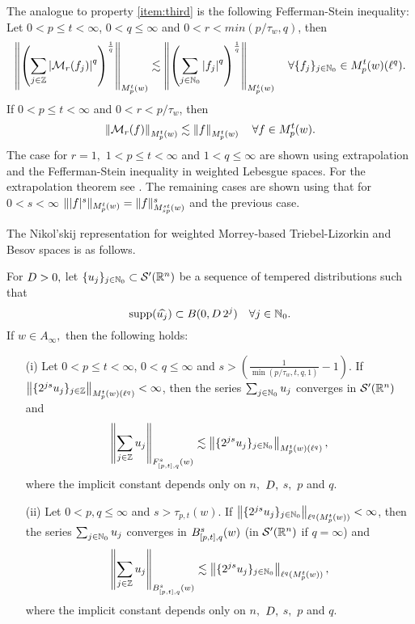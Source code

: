 {The analogue to property \ref{item:third} is the following Fefferman-Stein inequality:
Let $0<p\leq t<\infty$, $0<q\leq\infty$ and $0<r<min(p/\tau_w,q)$, then
\begin{equation}\label{eq:FTMorrey}
\norm{\left(\sum_{j\in\ent} \abs{\M_r(f_j)}^q\right)^{\frac{1}{q}}}{\mow{p}{t}{w}}\lesssim \norm{\left(\sum_{j\in\na_0} \abs{f_j}^q\right)^{\frac{1}{q}}}{\mow{p}{t}{w}}\quad \forall \{f_j\}_{j\in \na_0}\in \mow{p}{t}{w}(\ell^q).
\end{equation}
If $0<p\leq t <\infty$ and $0<r<p/\tau_w$, then 
\begin{equation*}
\norm{\M_r(f)}{\mow{p}{t}{w}}\lesssim \norm{f}{\mow{p}{t}{w}}\quad \forall f\in \mow{p}{t}{w}. 
\end{equation*}
The case for $r=1,$ $1<p\le t<\infty$ and $1<q\le \infty$ are shown using extrapolation and the Fefferman-Stein inequality in weighted Lebesgue spaces. For the extrapolation theorem see \cite[Theorem 5.3]{MR3538648}. The remaining cases are shown using that for $0<s<\infty$ $\| |f|^s \|_{\mow{p}{t}{w}} = \|f\|^s_{\mow{sp}{st}{w}}$ and the previous case.

The Nikol'skij representation for weighted Morrey-based Triebel-Lizorkin and Besov spaces is as follows.
\begin{theorem}\label{thm:Nikolskij:Morrey:weighted} For $\A> 0,$ let $\{u_j\}_{j \in \naz} \subset \mathcal{S}'(\rn)$ be a sequence of tempered distributions such that
\begin{equation*}
\supp(\widehat{u_j}) \subset B(0, \A\, 2^j ) \quad \forall j \in \naz.
\end{equation*}
If $w\in A_\infty,$ then the following holds:  
\begin{enumerate}
\item[(i)]\label{item:thh:Nikolskij:Morrey:TL} Let $0 < p \leq t < \infty$, $0 < q \leq \infty$ and $s > \left(\frac{1}{\min(p/\tau_w,t,q,1)} - 1 \right)$. If $\norm{\{2^{js} u_j\}_{j\in\ent}}{\mow{p}{t}{w}(\ell^{q})} < \infty$, then the series $\sum_{j \in \naz} u_j$ converges in $\mathcal{S}'(\rn)$ and 
\begin{equation*}
\norm{\sum_{j \in \ent} u_j}{\itlw{[p,t]}{s}{q}{w}} \lesssim  \norm{\{2^{js} u_j\}_{j\in\naz}}{\mow{p}{t}{w}(\ell^{q})},
\end{equation*}
where the implicit constant depends only on $n,$ $\A,$ $s,$ $p$ and  $q.$
\item[(ii)]\label{item:thh:Nikolskij:Morrey:B} Let $0 < p, q \leq \infty$ and $s > \tau_{p,t}(w)$. If $\norm{\{2^{js} u_j\}_{j\in\naz}}{\ell^{q}(\mow{p}{t}{w})} < \infty$, then the series $\sum_{j \in \naz} u_j$ converges in  $\ibesw{[p,t]}{s}{q}{w}$ (in $\mathcal{S}'(\rn)$ if $q=\infty$) and 
\begin{equation*}
\norm{\sum_{j \in \ent} u_j}{\ibesw{[p,t]}{s}{q}{w}} \lesssim  \norm{\{2^{js} u_j\}_{j\in\naz}}{\ell^{q}(\mow{p}{t}{w})},
\end{equation*}
where the implicit constant depends only on $n,$ $\A,$ $s,$ $p$ and $q.$
\end{enumerate}
\end{theorem}

}
